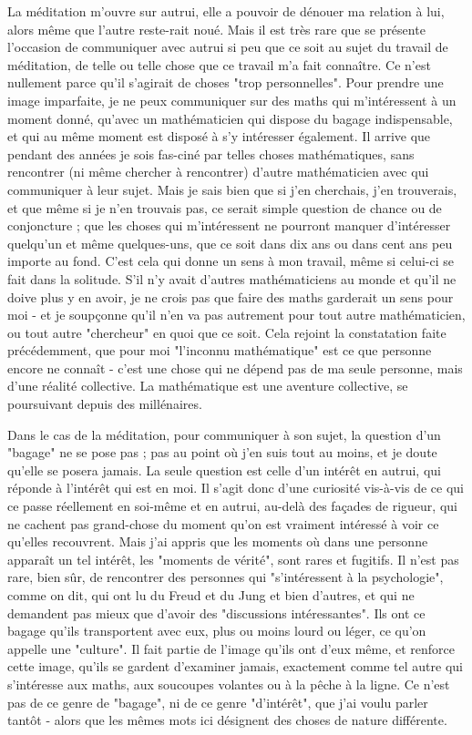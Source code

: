 La méditation m’ouvre sur autrui, elle a pouvoir de dénouer ma relation à lui, alors même que l’autre reste-rait noué. Mais il est très rare que se présente l'occasion de communiquer avec autrui si peu que ce soit au sujet du travail de méditation, de telle ou telle chose que ce travail m’a fait connaître. Ce n’est nullement parce qu’il s'agirait de choses "trop personnelles". Pour prendre une image imparfaite, je ne peux communiquer sur des maths qui m’intéressent à un moment donné, qu’avec un mathématicien qui dispose du bagage indispensable, et qui au même moment est disposé à s'y intéresser également. Il arrive que pendant des années je sois fas-ciné par telles choses mathématiques, sans rencontrer (ni même chercher à rencontrer) d’autre mathématicien avec qui communiquer à leur sujet. Mais je sais bien que si j'en cherchais, j'en trouverais, et que même si je n'en trouvais pas, ce serait simple question de chance ou de conjoncture ; que les choses qui m'intéressent ne pourront manquer d'intéresser quelqu'un et même quelques-uns, que ce soit dans dix ans ou dans cent ans peu importe au fond. C'est cela qui donne un sens à mon travail, même si celui-ci se fait dans la solitude. S'il n'y avait d'autres mathématiciens au monde et qu'il ne doive plus y en avoir, je ne crois pas que faire des maths garderait un sens pour moi - et je soupçonne qu’il n’en va pas autrement pour tout autre mathématicien, ou tout autre "chercheur" en quoi que ce soit. Cela rejoint la constatation faite précédemment, que pour moi "l'inconnu mathématique" est ce que personne encore ne connaît - c'est une chose qui ne dépend pas de ma seule personne, mais d'une réalité collective. La mathématique est une aventure collective, se poursuivant depuis des millénaires.

Dans le cas de la méditation, pour communiquer à son sujet, la question d'un "bagage" ne se pose pas ; pas au point où j'en suis tout au moins, et je doute qu'elle se posera jamais. La seule question est celle d'un intérêt en autrui, qui réponde à l'intérêt qui est en moi. Il s'agit donc d'une curiosité vis-à-vis de ce qui ce passe réellement en soi-même et en autrui, au-delà des façades de rigueur, qui ne cachent pas grand-chose du moment qu'on est vraiment intéressé à voir ce qu'elles recouvrent. Mais j'ai appris que les moments où dans une personne apparaît un tel intérêt, les "moments de vérité", sont rares et fugitifs. Il n'est pas rare, bien sûr, de rencontrer des personnes qui "s'intéressent à la psychologie", comme on dit, qui ont lu du Freud et du Jung et bien d'autres, et qui ne demandent pas mieux que d'avoir des "discussions intéressantes". Ils ont ce bagage qu'ils transportent avec eux, plus ou moins lourd ou léger, ce qu'on appelle une "culture". Il fait partie de l'image qu'ils ont d'eux même, et renforce cette image, qu'ils se gardent d'examiner jamais, exactement comme tel autre qui s'intéresse aux maths, aux soucoupes volantes ou à la pêche à la ligne. Ce n'est pas de ce genre de "bagage", ni de ce genre "d'intérêt", que j'ai voulu parler tantôt - alors que les mêmes mots ici désignent des choses de nature différente.

